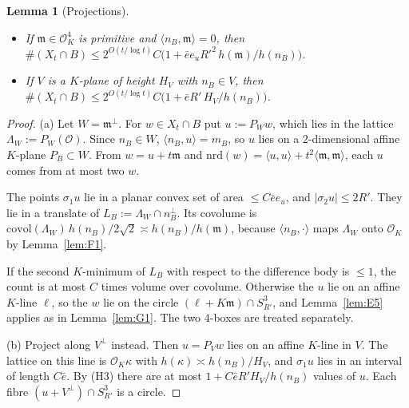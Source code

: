 \documentclass[aps,prx,twocolumn,superscriptaddress,nofootinbib,longbibliography]{revtex4-2}
\theoremstyle{plain}
\newtheorem{lemma}{Lemma}
\theoremstyle{definition}
\theoremstyle{remark}
\begin{document}
\begin{lemma}[Projections]\label{lem:G3}
\begin{itemize}\setlength\itemsep{0pt}
\item[(a)] If $\mathfrak m\in\mathcal O_K^4$ is primitive and $\langle n_B,\mathfrak m\rangle=0$, then
$\#(X_t\cap B)\le2^{O(t/\log t)}C\big(1+\bar ee_uR'^2\,h(\mathfrak m)/h(n_B)\big)$.
\item[(b)] If $V$ is a $K$-plane of height $H_V$ with $n_B\in V$, then
$\#(X_t\cap B)\le2^{O(t/\log t)}C\big(1+\bar eR'\,H_V/h(n_B)\big)$.
\end{itemize}
\end{lemma}
\begin{proof}
(a) Let $W=\mathfrak m^\perp$. For $w\in X_t\cap B$ put $u:=P_Ww$, which lies in the lattice
$\Lambda_W:=P_W(\mathcal O)$. Since $n_B\in W$, $\langle n_B,u\rangle=m_B$, so $u$ lies on a $2$-dimensional affine
$K$-plane $P_B\subset W$. From $w=u+t\mathfrak m$ and
$\mathrm{nrd}(w)=\langle u,u\rangle+t^2\langle\mathfrak m,\mathfrak m\rangle$, each $u$ comes from at most two $w$.

The points $\sigma_1u$ lie in a planar convex set of area $\le C\bar ee_u$, and $|\sigma_2u|\le2R'$. They lie in
a translate of $L_B:=\Lambda_W\cap n_B^\perp$. Its covolume is
$\mathrm{covol}(\Lambda_W)\,h(n_B)/2\sqrt2\asymp h(n_B)/h(\mathfrak m)$, because
$\langle n_B,\cdot\rangle$ maps $\Lambda_W$ onto $\mathcal O_K$ by Lemma~\ref{lem:F1}.

If the second $K$-minimum of $L_B$ with respect to the difference body is $\le1$, the count is at most $C$
times volume over covolume. Otherwise the $u$ lie on an affine $K$-line $\ell$, so the $w$ lie on the circle
$(\ell+K\mathfrak m)\cap S^3_{R'}$, and Lemma~\ref{lem:E5} applies as in Lemma~\ref{lem:G1}. The two
$4$-boxes are treated separately.

(b) Project along $V^\perp$ instead. Then $u=P_Vw$ lies on an affine $K$-line in $V$. The lattice on this
line is $\mathcal O_K\kappa$ with $h(\kappa)\asymp h(n_B)/H_V$, and $\sigma_1u$ lies in an interval of length
$C\bar e$. By (H3) there are at most $1+C\bar eR'H_V/h(n_B)$ values of $u$. Each fibre $(u+V^\perp)\cap S^3_{R'}$
is a circle.
\end{proof}
\end{document}
